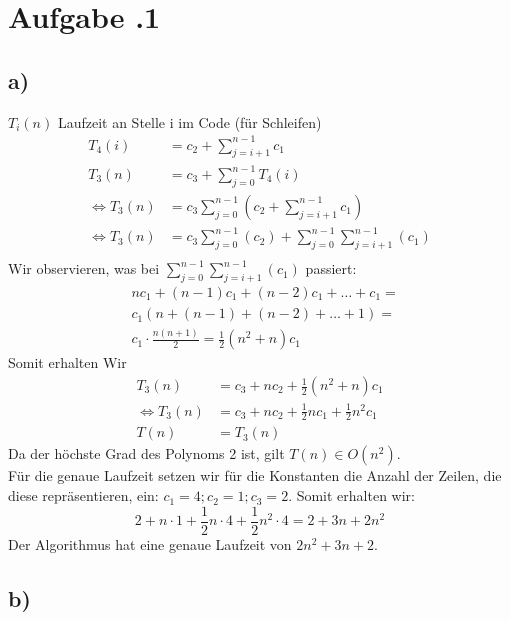 \section*{Aufgabe \bn.1}
\subsection*{a)}
$ T_i(n) $ Laufzeit an Stelle i im Code (für Schleifen)
\begin{align*}
	T_4(i) &= c_2 + \sum _{ j=i+1 } ^{ n-1 } c_1 \\
	T_3(n) &= c_3 + \sum _{ j=0 } ^{ n-1 } T_4(i) \\
	\iff T_3(n) &= c_3 \sum _{ j=0 } ^{ n-1 } \left(c_2 + \sum _{ j=i+1 } ^{ n-1 } c_1\right) \\
	\iff T_3(n) &= c_3 \sum _{ j=0 } ^{ n-1 } (c_2) + \sum _{ j=0 } ^{ n-1 } \sum _{ j=i+1 } ^{ n-1 } (c_1) \\
\end{align*}
Wir observieren, was bei $\sum _{ j=0 } ^{ n-1 } \sum _{ j=i+1 } ^{ n-1 } (c_1)$ passiert:
\begin{align*}
	&nc_1 + (n-1)c_1 + (n-2)c_1 + \dots + c_1 = \\
	&c_1(n+(n-1)+(n-2)+\dots+1) = \\
	&c_1\cdot \frac{ n(n+1) }{ 2 } = \frac{ 1 }{ 2 } (n^2+n)c_1
\end{align*}
Somit erhalten Wir
\begin{align*}
	T_3(n) &= c_3 + nc_2 + \frac{ 1 }{ 2 } (n^2+n)c_1 \\
	\iff T_3(n) &= c_3 + nc_2 + \frac{ 1 }{ 2 } nc_1 + \frac{ 1 }{ 2 } n^2c_1 \\
	T(n) &= T_3(n)
\end{align*}
Da der höchste Grad des Polynoms 2 ist, gilt $ T(n) \in O(n^2) $. \\
Für die genaue Laufzeit setzen wir für die Konstanten die Anzahl der Zeilen, die diese repräsentieren, ein: $ c_1 = 4; c_2 = 1; c_3 = 2 $. Somit erhalten wir:
\[
	2+n\cdot1+ \frac{ 1 }{ 2 } n\cdot 4 + \frac{ 1 }{ 2 } n^2\cdot 4 = 2 + 3n + 2n^2
\]
Der Algorithmus hat eine genaue Laufzeit von $ 2n^2 + 3n + 2 $.
\subsection*{b)}

